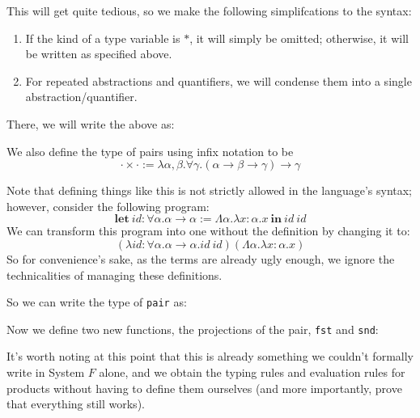 \documentclass[10pt]{article}
\begin{document}
This will get quite tedious, so we make the following simplifcations to the syntax:
\begin{enumerate}
    \item If the kind of a type variable is $*$, it will simply be omitted; otherwise, it will be written as specified above.
    \item For repeated abstractions and quantifiers, we will condense them into a single abstraction/quantifier.
\end{enumerate}
There, we will write the above as:

We also define the type of pairs using infix notation to be
\[
    \cdot \times \cdot := \lambda \alpha, \beta. \forall \gamma. (\alpha \to \beta \to \gamma) \to \gamma
\]

Note that defining things like this is not strictly allowed in the language's syntax; however, consider the following program:
\[
    \textbf{let}~id : \forall \alpha. \alpha \to \alpha := \Lambda \alpha. \lambda x : \alpha. x~\textbf{in} ~ id ~ id
\]
We can transform this program into one without the definition by changing it to:
\[
    (\lambda id : \forall \alpha. \alpha \to \alpha. id ~ id) (\Lambda \alpha . \lambda x : \alpha. x)
\]
So for convenience's sake, as the terms are already ugly enough, we ignore the technicalities of managing these definitions.

So we can write the type of \texttt{pair} as:

Now we define two new functions, the projections of the pair, \texttt{fst} and \texttt{snd}:

It's worth noting at this point that this is already something we couldn't formally write in System $F$ alone, and we obtain the typing rules and evaluation rules for products without having to define them ourselves (and more importantly, prove that everything still works).
\end{document}
